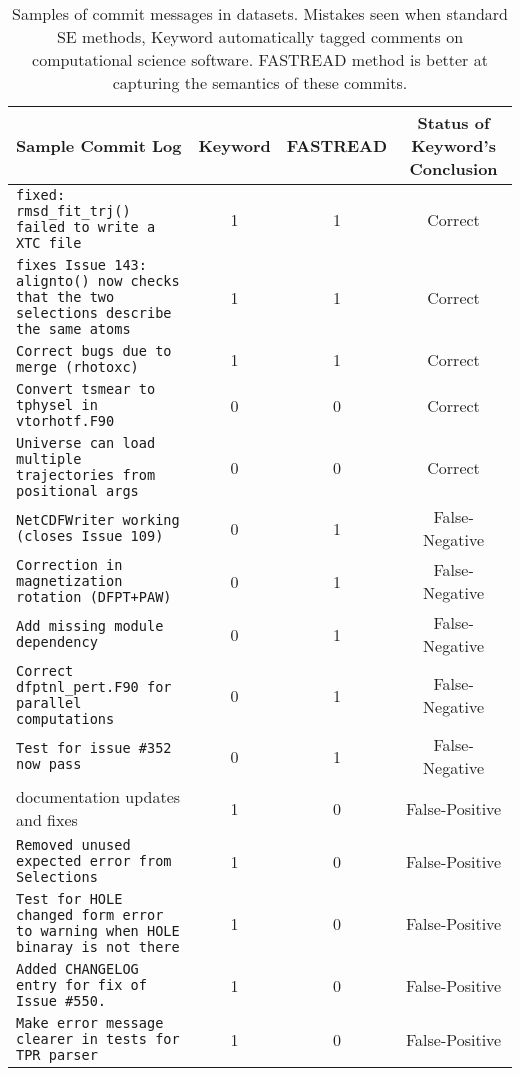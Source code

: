 \begin{table*}[!t]
\footnotesize
\begin{center}
\caption{Samples of commit messages in datasets. Mistakes seen when standard SE methods, Keyword automatically tagged comments on computational science software. FASTREAD method is better at capturing the semantics of these commits.} 
\vspace{-5pt}
\begin{tabular}{l|ccc}
Sample Commit Log & Keyword & FASTREAD & Status of Keyword's Conclusion\\ 
\hline
\texttt{fixed: rmsd\_fit\_trj() failed to write a XTC file} & 1 & 1 & Correct \\ 
\texttt{fixes Issue 143: alignto() now checks that the two selections describe the same atoms} & 1 &	1 & Correct \\ 
\texttt{Correct bugs due to merge (rhotoxc)}	& 1 &	1 & Correct\\ 
\texttt{Convert tsmear to tphysel in vtorhotf.F90} &	0 &	0 & Correct\\ 
\texttt{Universe can load multiple trajectories from positional args} &	0 &	0 & Correct \\ \hline
\texttt{NetCDFWriter working (closes Issue 109)}	& 0 &	1 & False-Negative\\ 
\texttt{Correction in magnetization rotation (DFPT+PAW)} &	0 &	1 & False-Negative\\
\texttt{Add missing module dependency} &	0 &	1 & False-Negative\\ 
\texttt{Correct dfptnl\_pert.F90 for parallel computations} &	0 &	1 & False-Negative\\ 
\texttt{Test for issue \#352 now pass} &	0 &	1 & False-Negative\\ \hline
documentation updates and fixes &	1 &	0 & False-Positive \\ 
\texttt{Removed unused expected error from Selections} &	1 &	0 & False-Positive \\ 
\texttt{Test for HOLE changed form error to warning when HOLE binaray is not there} &	1 &	0 & False-Positive \\ 
\texttt{Added CHANGELOG entry for fix of Issue \#550.} &	1 &	0 & False-Positive \\ 
\texttt{Make error message clearer in tests for TPR parser} &	1 &	0 & False-Positive \\ \hline
\end{tabular}
\label{tbl:sample}
\end{center} 
\end{table*}